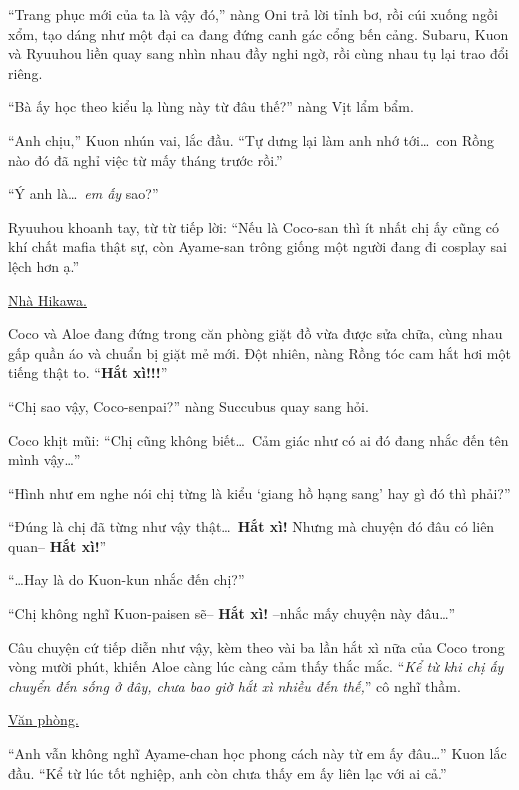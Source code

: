 \documentclass[../main.tex]{subfiles}
\begin{document}
``Trang phục mới của ta là vậy đó,'' nàng Oni trả lời tỉnh bơ, rồi cúi xuống ngồi xổm, tạo dáng như một đại ca đang đứng canh gác cổng bến cảng. Subaru, Kuon và Ryuuhou liền quay sang nhìn nhau đầy nghi ngờ, rồi cùng nhau tụ lại trao đổi riêng.

``Bà ấy học theo kiểu lạ lùng này từ đâu thế?'' nàng Vịt lẩm bẩm.

``Anh chịu,'' Kuon nhún vai, lắc đầu. ``Tự dưng lại làm anh nhớ tới\dots\ con Rồng nào đó đã nghỉ việc từ mấy tháng trước rồi.''

``Ý anh là\dots\ \emph{em ấy} sao?''

Ryuuhou khoanh tay, từ từ tiếp lời: ``Nếu là Coco-san thì ít nhất chị ấy cũng có khí chất mafia thật sự, còn Ayame-san trông giống một người đang đi cosplay sai lệch hơn ạ.''

\il

\begin{center}
  \uline{Nhà Hikawa.}
\end{center}

Coco và Aloe đang đứng trong căn phòng giặt đồ vừa được sửa chữa, cùng nhau gấp quần áo và chuẩn bị giặt mẻ mới. Đột nhiên, nàng Rồng tóc cam hắt hơi một tiếng thật to. ``\textbf{Hắt xì!!!}''

``Chị sao vậy, Coco-senpai?'' nàng Succubus quay sang hỏi.

Coco khịt mũi: ``Chị cũng không biết\dots\ Cảm giác như có ai đó đang nhắc đến tên mình vậy\dots''

``Hình như em nghe nói chị từng là kiểu `giang hồ hạng sang' hay gì đó thì phải?''

``Đúng là chị đã từng như vậy thật\dots\ \textbf{Hắt xì!} Nhưng mà chuyện đó đâu có liên quan-- \textbf{Hắt xì!}''

``\dots Hay là do Kuon-kun nhắc đến chị?''

``Chị không nghĩ Kuon-paisen sẽ-- \textbf{Hắt xì!} --nhắc mấy chuyện này đâu\dots''

Câu chuyện cứ tiếp diễn như vậy, kèm theo vài ba lần hắt xì nữa của Coco trong vòng mười phút, khiến Aloe càng lúc càng cảm thấy thắc mắc. ``\textit{Kể từ khi chị ấy chuyển đến sống ở đây, chưa bao giờ hắt xì nhiều đến thế,}'' cô nghĩ thầm.

\il

\begin{center}
  \uline{Văn phòng.}
\end{center}

``Anh vẫn không nghĩ Ayame-chan học phong cách này từ em ấy đâu\dots'' Kuon lắc đầu. ``Kể từ lúc tốt nghiệp, anh còn chưa thấy em ấy liên lạc với ai cả.''
\end{document}
